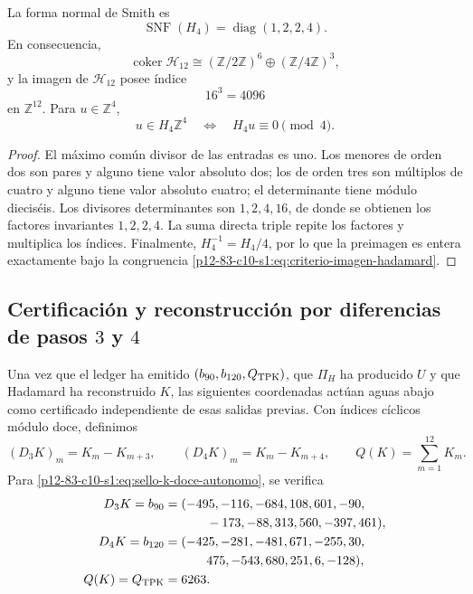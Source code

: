 \begin{theorem}
\label{p12-83-c10-s1:thm:smith-hadamard-autonomo}
La forma normal de Smith es
\begin{equation}
 \operatorname{SNF}(H_4)=\operatorname{diag}(1,2,2,4).
 \label{p12-83-c10-s1:eq:snf-hadamard-autonoma}
\end{equation}
En consecuencia,
\begin{equation}
 \operatorname{coker}\mathcal H_{12}
 \cong(\mathbb Z/2\mathbb Z)^6
 \oplus(\mathbb Z/4\mathbb Z)^3,
 \label{p12-83-c10-s1:eq:cociente-hadamard-doce}
\end{equation}
y la imagen de \(\mathcal H_{12}\) posee índice
\[
 16^3=4096
\]
en \(\mathbb Z^{12}\). Para \(u\in\mathbb Z^4\),
\begin{equation}
 u\in H_4\mathbb Z^4
 \quad\Longleftrightarrow\quad
 H_4u\equiv0\pmod4.
 \label{p12-83-c10-s1:eq:criterio-imagen-hadamard}
\end{equation}
\end{theorem}

\begin{proof}
El máximo común divisor de las entradas es uno. Los menores de orden dos son
pares y alguno tiene valor absoluto dos; los de orden tres son múltiplos de
cuatro y alguno tiene valor absoluto cuatro; el determinante tiene módulo
dieciséis. Los divisores determinantes son \(1,2,4,16\), de donde se obtienen
los factores invariantes \(1,2,2,4\). La suma directa triple repite los
factores y multiplica los índices. Finalmente,
\(H_4^{-1}=H_4/4\), por lo que la preimagen es entera exactamente bajo la
congruencia \eqref{p12-83-c10-s1:eq:criterio-imagen-hadamard}.
\end{proof}

\subsection{Certificación y reconstrucción por diferencias de pasos \(3\) y \(4\)}

Una vez que el ledger ha emitido \((b_{90},b_{120},Q_{\rm TPK})\), que
\(\Pi_H\) ha producido \(U\) y que Hadamard ha reconstruido \(K\), las
siguientes coordenadas actúan aguas abajo como certificado independiente de
esas salidas previas. Con índices cíclicos módulo doce, definimos
\begin{equation}
 (D_3K)_m=K_m-K_{m+3},
 \qquad
 (D_4K)_m=K_m-K_{m+4},
 \qquad
 Q(K)=\sum_{m=1}^{12}K_m.
 \label{p12-83-c10-s1:eq:extractor-diferencias-k}
\end{equation}
Para \eqref{p12-83-c10-s1:eq:sello-k-doce-autonomo}, se verifica
\begin{align*}
 D_3K=b_{90}={}&(-495,-116,-684,108,601,-90,\\
         &\qquad-173,-88,313,560,-397,461),\\
 D_4K=b_{120}={}&(-425,-281,-481,671,-255,30,\\
         &\qquad475,-543,680,251,6,-128),\\
 Q(K)=Q_{\rm TPK}={}&6263.
\end{align*}


